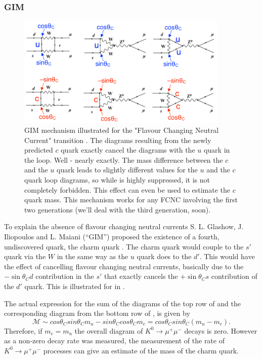 \subsubsection{GIM}
\begin{figure}
\centering
\includegraphics[width=0.9\textwidth]{fig/0_K2mumuGIM}
\caption{GIM mechanism illustrated for the "Flavour Changing Neutral Current" transition . The diagrams resulting from the newly predicted $c$ quark exactly cancel the diagrams with the $u$ quark in the loop. Well - nearly exactly. The mass difference between the $c$ and the $u$ quark leads to slightly different values for the $u$ and the $c$ quark loop diagrams, so while  is highly suppressed, it is not completely forbidden. This effect can even be used to estimate the $c$ quark mass. This mechanism works for any FCNC involving the first two generations (we'll deal with the third generation, soon).
\label{fig:K2mumuGIM}}
\end{figure}
 To explain the absence of flavour changing neutral currents
 S. L. Glashow,
 J. Iliopoulos and L. Maiani (``GIM'') proposed the existence of a
 fourth, undiscovered quark, the charm quark \cite{physrev:gim}. The
 charm quark would couple to the $s'$ quark via the $W$ in the same way as the $u$ quark does to the $d'$. This would have the effect of cancelling flavour changing neutral currents, basically due to the $-\sin\theta_C d$ contribution in the $s'$ that exactly cancels the $+\sin\theta_C s$ contribution of the $d'$ quark. This is illustrated for  in . 

The actual expression for the sum of the diagrams of the top row of  and the corresponding diagram from the bottom row of  , is given by
\[
\mathcal{M}\sim cos\theta_{C}sin\theta_{C}m_{u}-sin\theta_{C}cos\theta_{C}m_{c}=cos\theta_{C}sin\theta_{C}(m_{u}-m_{c}).
\]
Therefore, if $m_{c}=m_{u}$ the overall diagram of $K^0\to\mu^+\mu^-$ decays is zero. However as a non-zero decay rate was measured, the measurement of the rate of $K^0\to\mu^+\mu^-$ processes can give an estimate of the mass of the charm quark.

